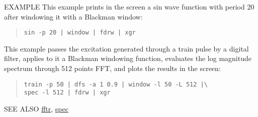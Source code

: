 \begin{qsection}{EXAMPLE}
This example prints in the screen a sin wave function
with period 20 after windowing it with a Blackman window:
\begin{quote}
  \verb!sin -p 20 | window | fdrw | xgr !
\end{quote}
\par
This example passes the excitation generated through a train pulse
by a digital filter, applies to it a Blackman windowing function,
evaluates the log magnitude spectrum through 512 points FFT,
and plots the results in the screen:
\begin{quote}
\verb!train -p 50 | dfs -a 1 0.9 | window -l 50 -L 512 |\! \\
\verb!spec -l 512 | fdrw | xgr!
\end{quote}
\end{qsection}

\begin{qsection}{SEE ALSO}
\hyperlink{fftr}{fftr},
\hyperlink{spec}{spec}
\end{qsection}

